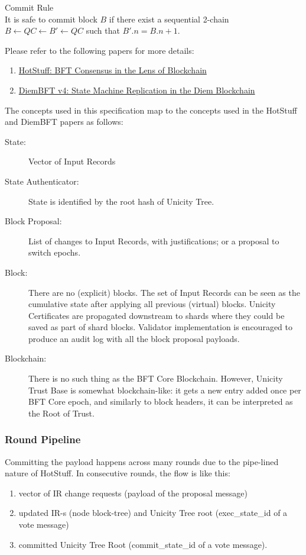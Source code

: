 \begin{ruledef}{Commit Rule} \\
    It is safe to commit block $B$ if there exist a sequential 2-chain $B \leftarrow QC \leftarrow B' \leftarrow QC$ such that $B'.n = B.n + 1$.
\end{ruledef}

Please refer to the following papers for more details:

\begin{enumerate}
  \item \href{https://arxiv.org/abs/1803.05069}{HotStuff: BFT Consensus in the Lens of Blockchain}
  \item \href{https://developers.diem.com/papers/diem-consensus-state-machine-replication-in-the-diem-blockchain/2021-08-17.pdf}{DiemBFT v4: State Machine Replication in the Diem Blockchain}
\end{enumerate}

The concepts used in this specification map to the concepts used in the HotStuff and DiemBFT papers as follows:

\begin{description}
  \item[State:] Vector of Input Records
  \item[State Authenticator:] State is identified by the root hash of Unicity Tree.
  \item[Block Proposal:] List of changes to Input Records, with justifications; or a proposal to switch epochs.
  \item[Block:] There are no (explicit) blocks. The set of Input Records can be seen as the cumulative state after applying all previous (virtual) blocks. Unicity Certificates are propagated downstream to shards where they could be saved as part of shard blocks. Validator implementation is encouraged to produce an audit log with all the block proposal payloads.
  \item[Blockchain:] There is no such thing as the BFT Core Blockchain. However, Unicity Trust Base is somewhat blockchain-like: it gets a new entry added once per BFT Core epoch, and similarly to block headers, it can be interpreted as the Root of Trust.
\end{description}

\subsubsection{Round Pipeline}

Committing the payload happens across many rounds due to the pipe-lined nature of HotStuff. In consecutive rounds, the flow is like this:
\begin{enumerate}[nosep]
  \item vector of IR change requests (payload of the proposal message)
  \item updated IR-s (node block-tree) and Unicity Tree root (exec\_state\_id of a vote message)
  \item committed Unicity Tree Root (commit\_state\_id of a vote message).
\end{enumerate}

